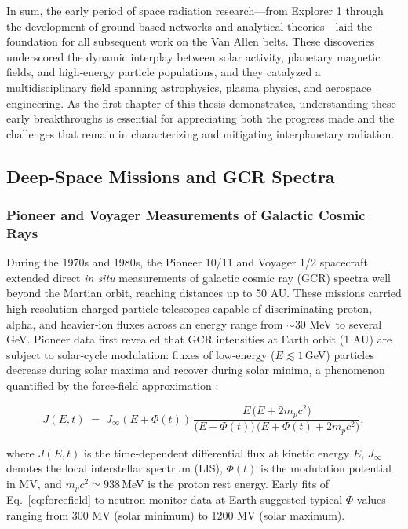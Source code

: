 \documentclass[12pt]{report}
\begin{document}
In sum, the early period of space radiation research—from Explorer 1 through the development of ground‐based networks and analytical theories—laid the foundation for all subsequent work on the Van Allen belts.  These discoveries underscored the dynamic interplay between solar activity, planetary magnetic fields, and high‐energy particle populations, and they catalyzed a multidisciplinary field spanning astrophysics, plasma physics, and aerospace engineering.  As the first chapter of this thesis demonstrates, understanding these early breakthroughs is essential for appreciating both the progress made and the challenges that remain in characterizing and mitigating interplanetary radiation.  

\subsection{Deep-Space Missions and GCR Spectra}
\subsubsection{Pioneer and Voyager Measurements of Galactic Cosmic Rays}

During the 1970s and 1980s, the Pioneer 10/11 and Voyager 1/2 spacecraft extended direct \emph{in situ} measurements of galactic cosmic ray (GCR) spectra well beyond the Martian orbit, reaching distances up to 50 AU.  These missions carried high‐resolution charged‐particle telescopes capable of discriminating proton, alpha, and heavier‐ion fluxes across an energy range from $\sim$30 MeV to several GeV.  Pioneer data first revealed that GCR intensities at Earth orbit (1 AU) are subject to solar‐cycle modulation: fluxes of low‐energy ($E\lesssim1\,$GeV) particles decrease during solar maxima and recover during solar minima, a phenomenon quantified by the force‐field approximation \cite{gleeson1968solar}:

\begin{equation}
  J(E, t) \;=\; J_{\infty}(E + \Phi(t)) 
    \,\frac{E\,\bigl(E + 2m_p c^2\bigr)}
         {\bigl(E + \Phi(t)\bigr)\,\bigl(E + \Phi(t) + 2m_p c^2\bigr)},
  \label{eq:forcefield}
\end{equation}

\noindent where $J(E, t)$ is the time‐dependent differential flux at kinetic energy $E$, $J_{\infty}$ denotes the local interstellar spectrum (LIS), $\Phi(t)$ is the modulation potential in MV, and $m_p c^2\simeq938\,$MeV is the proton rest energy.  Early fits of Eq.~\eqref{eq:forcefield} to neutron‐monitor data at Earth suggested typical $\Phi$ values ranging from 300 MV (solar minimum) to 1200 MV (solar maximum).
\end{document}
